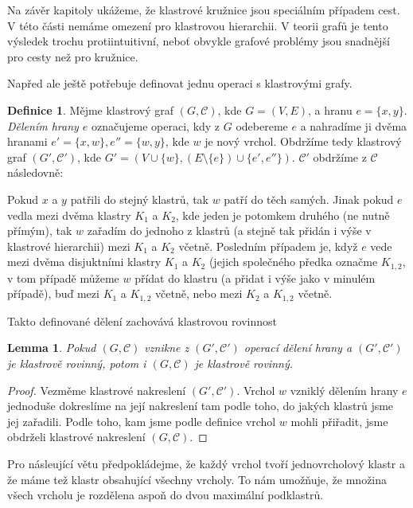 \documentclass[12pt,a4report]{report}
\newtheorem{lemma}[theorem]{Lemma}
\theoremstyle{definition}
\newtheorem{defn}[theorem]{Definice}
\begin{document}
Na závěr kapitoly ukážeme, že klastrové kružnice jsou speciálním případem cest. V této části nemáme omezení pro klastrovou hierarchii. V teorii grafů je tento výsledek trochu protiintuitivní, neboť obvykle grafové problémy jsou snadnější pro cesty než pro kružnice. 

Napřed ale ještě potřebuje definovat jednu operaci s klastrovými grafy.

\begin{defn}Mějme klastrový graf $(G, \mathcal C)$, kde $G=(V,E)$, a hranu $e=\{x,y\}$. \textit{Dělením hrany $e$} označujeme operaci, kdy z $G$ odebereme $e$ a nahradíme ji dvěma hranami $e'=\{x,w\}, e''=\{w,y\}$, kde $w$ je nový vrchol. Obdržíme tedy klastrový graf $(G', \mathcal C')$, kde $G'=(V \cup \{w\},(E \setminus \{e\}) \cup \{e',e''\})$. $\mathcal C'$ obdržíme z $\mathcal C$ následovně:

Pokud $x$ a $y$ patřili do stejný klastrů, tak $w$ patří do těch samých. Jinak pokud $e$ vedla mezi dvěma klastry $K_1$ a $K_2$, kde jeden je potomkem druhého (ne nutně přímým), tak $w$ zařadím do jednoho z klastrů (a stejně tak přidán i výše v klastrové hierarchii) mezi $K_1$ a $K_2$ včetně. Posledním případem je, když $e$ vede mezi dvěma disjuktními klastry $K_1$ a $K_2$ (jejich společného předka označme $K_{1,2}$, v tom případě můžeme $w$ přídat do klastru (a přidat i výše jako v minulém případě), buď mezi $K_1$ a $K_{1,2}$ včetně, nebo  mezi $K_2$ a $K_{1,2}$ včetně.
\end{defn}

Takto definované dělení zachovává klastrovou rovinnost

\begin{lemma}
Pokud $(G, \mathcal C)$ vznikne z $(G', \mathcal C')$ operací dělení hrany a $(G', \mathcal C')$ je klastrově rovinný, potom i $(G, \mathcal C)$ je klastrově rovinný.
\end{lemma}
\begin{proof}
Vezměme klastrové nakreslení $(G', \mathcal C')$. Vrchol $w$ vzniklý dělením hrany $e$ jednoduše dokreslíme na její nakreslení tam podle toho, do jakých klastrů jsme jej zařadili. Podle toho, kam jsme podle definice vrchol $w$ mohli přiřadit, jsme obdrželi klastrové nakreslení $(G, \mathcal C)$.
\end{proof}

Pro násleující větu předpokládejme, že každý vrchol tvoří jednovrcholový klastr a že máme tež klastr obsahující všechny vrcholy. To nám umožňuje, že množina všech vrcholu je rozdělena aspoň do dvou maximální podklastrů.
\end{document}
